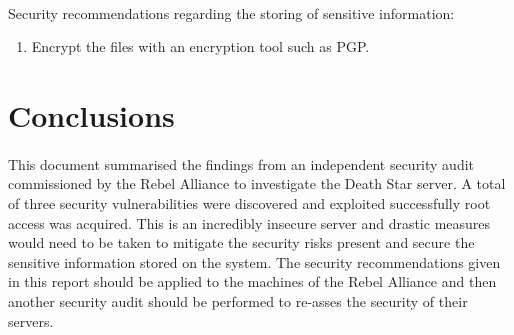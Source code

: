 \documentclass{article}
\begin{document}
\paragraph{}
\begin{adjustwidth}{1.5cm}{1.5cm}
	Security recommendations regarding the storing of sensitive information:
	\begin{enumerate}
		\item Encrypt the files with an encryption tool such as PGP.
	\end{enumerate}
\end{adjustwidth}
\newpage

\section{Conclusions}
\label{sec:conclusions}
\paragraph{}
This document summarised the findings from an independent security audit commissioned by the Rebel Alliance to investigate the Death Star server.
A total of three security vulnerabilities were discovered and exploited successfully root access was acquired.
This is an incredibly insecure server and drastic measures would need to be taken to mitigate the security risks present and secure the sensitive information stored on the system.
The security recommendations given in this report should be applied to the machines of the Rebel Alliance and then another security audit should be performed to re-asses the security of their servers.

\newpage
\end{document}
